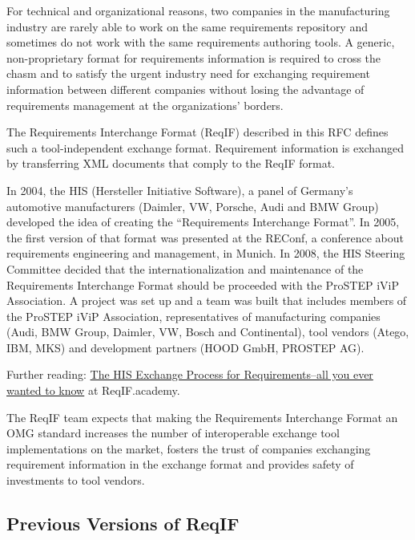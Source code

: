 For technical and organizational reasons, two companies in the manufacturing industry are rarely able to work on the same requirements repository and sometimes do not work with the same requirements authoring tools.  A generic, non-proprietary format for requirements information is required to cross the chasm and to satisfy the urgent industry need for exchanging requirement information between different companies without losing the advantage of requirements management at the organizations' borders.

The Requirements Interchange Format (ReqIF) described in this RFC defines such a tool-independent exchange format.  Requirement information is exchanged by transferring XML documents that comply to the ReqIF format.

In 2004, the HIS (Hersteller Initiative Software), a panel of Germany's automotive manufacturers (Daimler, VW, Porsche, Audi and BMW Group) developed the idea of creating the ``Requirements Interchange Format''.  In 2005, the first version of that format was presented at the REConf, a conference about requirements engineering and management, in Munich.  In 2008, the HIS Steering Committee decided that the internationalization and maintenance of the Requirements Interchange Format should be proceeded with the ProSTEP iViP Association.  A project was set up and a team was built that includes members of the ProSTEP iViP Association, representatives of manufacturing companies (Audi, BMW  Group, Daimler, VW, Bosch and Continental), tool vendors (Atego, IBM, MKS) and development partners (HOOD GmbH, PROSTEP AG).

\begin{info}
Further reading: \href{https://reqif.academy/faq/his-process/}{The HIS Exchange Process for Requirements–all you ever wanted to know} at ReqIF.academy.
\end{info}

The ReqIF team expects that making the Requirements Interchange Format an OMG standard increases the number of interoperable exchange tool implementations on the market, fosters the trust of companies exchanging requirement information in the exchange format and provides safety of investments to tool vendors.

\subsection{Previous Versions of ReqIF}
\label{sec:RIF}

